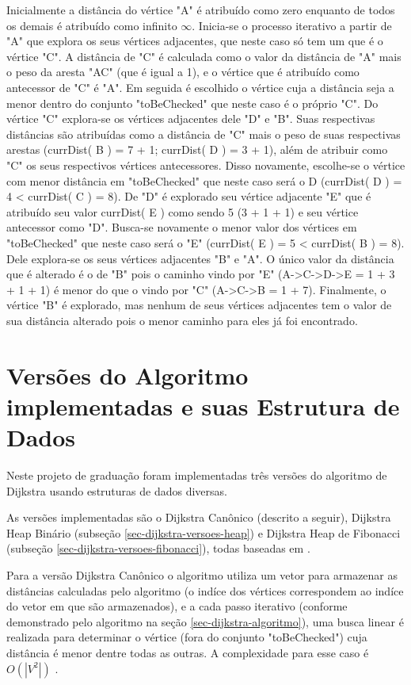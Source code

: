 Inicialmente a distância do vértice "A" é atribuído como zero enquanto de todos os demais é atribuído como infinito $\infty$. Inicia-se o processo iterativo a partir de "A" que explora os seus vértices adjacentes, que neste caso só tem um que é o vértice "C". A distância de "C" é calculada como o valor da distância de "A" mais o peso da aresta "AC" (que é igual a 1), e o vértice que é atribuído como antecessor de "C" é "A". Em seguida é escolhido o vértice cuja a distância seja a menor dentro do conjunto "toBeChecked" que neste caso é o próprio "C". Do vértice "C" explora-se os vértices adjacentes dele "D" e "B". Suas respectivas distâncias são atribuídas como a distância de "C" mais o peso de suas respectivas arestas (currDist( B ) = 7 + 1; currDist( D ) = 3 + 1), além de atribuir como "C" os seus respectivos vértices antecessores. Disso novamente, escolhe-se o vértice com menor distância em "toBeChecked" que neste caso será o D (currDist( D ) = 4 < currDist( C ) = 8). De "D" é explorado seu vértice adjacente "E" que é atribuído seu valor currDist( E ) como sendo 5 (3 + 1 + 1) e seu vértice antecessor como "D". Busca-se novamente o menor valor dos vértices em "toBeChecked" que neste caso será o "E" (currDist( E ) = 5 < currDist( B ) = 8). Dele explora-se os seus vértices adjacentes "B" e "A". O único valor da distância que é alterado é o de "B" pois o caminho vindo por "E" (A->C->D->E = 1 + 3 + 1 + 1) é menor do que o vindo por "C"  (A->C->B = 1 + 7). Finalmente, o vértice "B" é explorado, mas nenhum de seus vértices adjacentes tem o valor de sua distância alterado pois o menor caminho para eles já foi encontrado.

\section{Versões do Algoritmo implementadas e suas Estrutura de Dados}
\label{sec-dijkstra-versoes}
Neste projeto de graduação foram implementadas três versões do algoritmo de Dijkstra usando estruturas de dados diversas.

As versões implementadas são o Dijkstra Canônico (descrito a seguir), Dijkstra Heap Binário (subseção \ref{sec-dijkstra-versoes-heap}) e Dijkstra Heap de Fibonacci (subseção \ref{sec-dijkstra-versoes-fibonacci}), todas baseadas em .

Para a versão Dijkstra Canônico o algoritmo utiliza um vetor para armazenar as distâncias calculadas pelo algoritmo (o indíce dos vértices correspondem ao indíce do vetor em que são armazenados), e a cada passo iterativo (conforme demonstrado pelo algoritmo na seção \ref{sec-dijkstra-algoritmo}), uma busca linear é realizada para determinar o vértice (fora do conjunto "toBeChecked") cuja distância é menor dentre todas as outras. A complexidade para esse caso é $O(|V^{2}|)$ \cite{drozdek2012data}.

